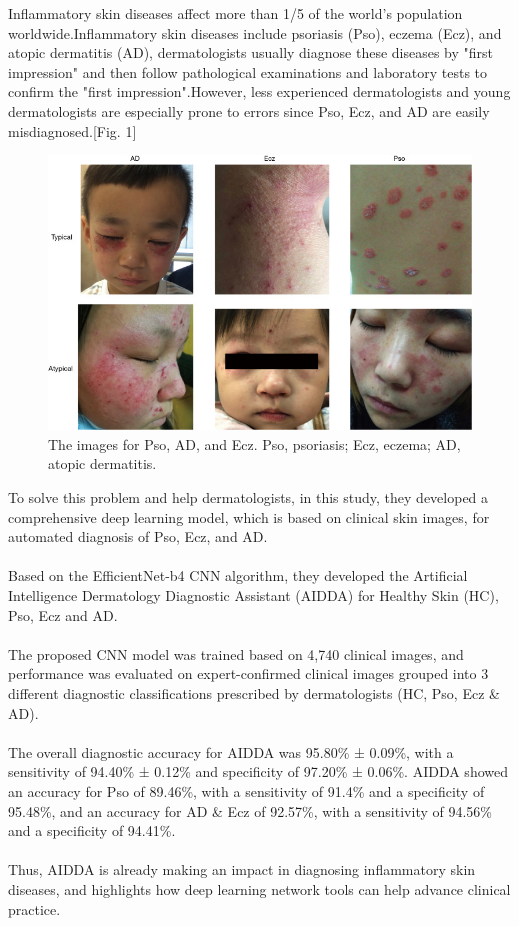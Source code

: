  Inflammatory skin diseases affect more than 1/5 of the world's population worldwide.Inflammatory skin diseases include psoriasis (Pso), eczema (Ecz), and atopic dermatitis (AD), dermatologists usually diagnose these diseases by "first impression" and then follow pathological examinations and laboratory tests to confirm the "first impression".However, less experienced dermatologists and young dermatologists are especially prone to errors since Pso, Ecz, and AD are easily misdiagnosed.[Fig. 1]
 \begin{figure}[!ht]
 \centering 
 \includegraphics{backmatter/figures/fig.jpg}
 \caption{The images for Pso, AD, and Ecz. Pso, psoriasis; Ecz, eczema; AD, atopic dermatitis.}
 \end{figure}
To solve this problem and help dermatologists, in this study, they developed a comprehensive deep learning model, which is based on clinical skin images, for automated diagnosis of Pso, Ecz, and AD.\\\\

Based on the EfficientNet-b4 CNN algorithm, they developed the Artificial Intelligence Dermatology Diagnostic Assistant (AIDDA) for Healthy Skin (HC), Pso, Ecz and AD.\\\\

The proposed CNN model was trained based on 4,740 clinical images, and performance was evaluated on expert-confirmed clinical images grouped into 3 different diagnostic classifications prescribed by dermatologists (HC, Pso, Ecz \& AD).\\\\
The overall diagnostic accuracy for AIDDA was 95.80\% ± 0.09\%, with a sensitivity of 94.40\% ± 0.12\% and specificity of 97.20\% ± 0.06\%. AIDDA showed an accuracy for Pso of 89.46\%, with a sensitivity of 91.4\% and a specificity of 95.48\%, and an accuracy for AD \& Ecz of 92.57\%, with a sensitivity of 94.56\% and a specificity of 94.41\%.\\\\
Thus, AIDDA is already making an impact in diagnosing inflammatory skin diseases, and highlights how deep learning network tools can help advance clinical practice.
